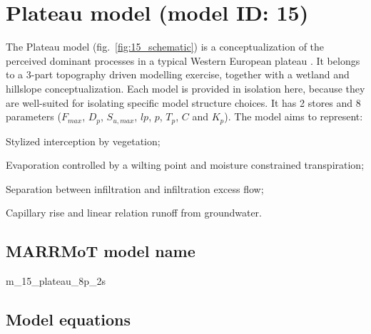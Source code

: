 \section{Plateau model (model ID: 15)}
The Plateau model (fig.~\ref{fig:15_schematic}) is a conceptualization of the perceived dominant processes in a typical Western European plateau \citep{Savenije2010}. It belongs to a 3-part topography driven modelling exercise, together with a wetland and hillslope conceptualization. Each model is provided in isolation here, because they are well-suited for isolating specific model structure choices. It has 2 stores and 8 parameters ($F_{max}$, $D_p$, $S_{u,max}$, $lp$, $p$, $T_p$, $C$ and $K_p$). The model aims to represent:

\begin{itemizecompact}
\item Stylized interception by vegetation;
\item Evaporation controlled by a wilting point and moisture constrained transpiration;
\item Separation between infiltration and infiltration excess flow;
\item Capillary rise and linear relation runoff from groundwater.
\end{itemizecompact}

\subsection{MARRMoT model name}
m\_15\_plateau\_8p\_2s \\

\subsection{Model equations}

